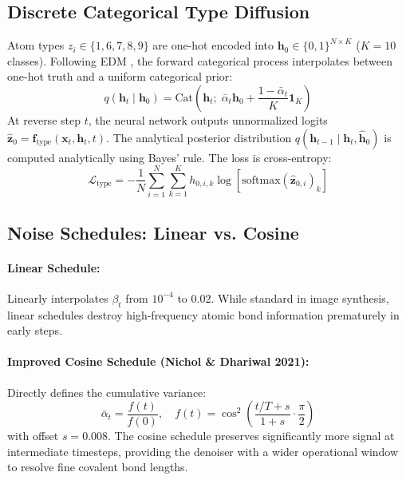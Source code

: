 \documentclass[12pt, a4paper]{article}
\begin{document}
\subsection{Discrete Categorical Type Diffusion}
Atom types $z_i \in \{1, 6, 7, 8, 9\}$ are one-hot encoded into $\mathbf{h}_0 \in \{0, 1\}^{N \times K}$ ($K=10$ classes). Following EDM \cite{hoogeboom2022equivariant}, the forward categorical process interpolates between one-hot truth and a uniform categorical prior:
\begin{equation}
    q(\mathbf{h}_t \mid \mathbf{h}_0) = \text{Cat}\left(\mathbf{h}_t;\; \bar{\alpha}_t \mathbf{h}_0 + \frac{1 - \bar{\alpha}_t}{K}\mathbf{1}_K\right)
\end{equation}
At reverse step $t$, the neural network outputs unnormalized logits $\hat{\mathbf{z}}_0 = \mathbf{f}_\text{type}(\mathbf{x}_t, \mathbf{h}_t, t)$. The analytical posterior distribution $q(\mathbf{h}_{t-1} \mid \mathbf{h}_t, \hat{\mathbf{h}}_0)$ is computed analytically using Bayes' rule. The loss is cross-entropy:
\begin{equation}
    \mathcal{L}_\text{type} = -\frac{1}{N} \sum_{i=1}^N \sum_{k=1}^K h_{0, i, k} \log \left[\text{softmax}(\hat{\mathbf{z}}_{0, i})_k\right]
\end{equation}

\subsection{Noise Schedules: Linear vs. Cosine}
\paragraph{Linear Schedule:} Linearly interpolates $\beta_t$ from $10^{-4}$ to $0.02$. While standard in image synthesis, linear schedules destroy high-frequency atomic bond information prematurely in early steps.
\paragraph{Improved Cosine Schedule (Nichol \& Dhariwal 2021):} Directly defines the cumulative variance:
\begin{equation}
    \bar{\alpha}_t = \frac{f(t)}{f(0)}, \quad f(t) = \cos^2\!\left(\frac{t/T + s}{1 + s} \cdot \frac{\pi}{2}\right)
\end{equation}
with offset $s = 0.008$. The cosine schedule preserves significantly more signal at intermediate timesteps, providing the denoiser with a wider operational window to resolve fine covalent bond lengths.
\end{document}
